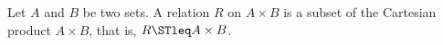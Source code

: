 \begin{definition}
\label{def:relation}
	Let $A$ and $B$ be two sets. A relation $R$ on $A \times B$ is a subset of the Cartesian product $A \times B$, that is, $R \STleq A \times B$.
\end{definition}